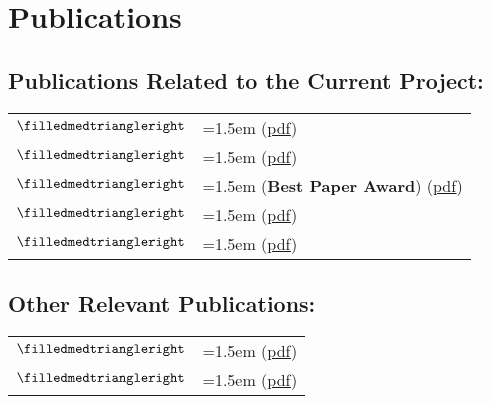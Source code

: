 \documentclass[12pt,letterpaper,oneside]{article}
\newcommand{\gbulletlight}{\footnotesize{\color{bulletgray2}$\filledmedtriangleright$}}
\newcommand{\pindent}{\hangindent=1.5em\hangafter=1}
\begin{document}
    
    \begingroup
        \makeatletter
        \let\@bibitem\saved@bibitem
    \endgroup

    \section{Publications}
    \label{sec:pubs}
        \vspace{-1.0em}
        \subsection{Publications Related to the Current Project:}
        \label{subsec:relatedpubs}
            \vspace{-1.5em}
            \begin{longtable}{XY}
                \gbulletlight{} & \pindent{} (\href{http://bconnelly.net/wp-content/papercite-data/pdf/beckmann2012evolution.pdf}{pdf})\\
                \gbulletlight{} & \pindent{} (\href{http://bconnelly.net/wp-content/papercite-data/pdf/connelly2011modeling.pdf}{pdf})\\
                \gbulletlight{} & \pindent{} ({\bfseries Best Paper Award}) (\href{http://bconnelly.net/wp-content/papercite-data/pdf/connelly2010resource.pdf}{pdf})\\
                \gbulletlight{} & \pindent{} (\href{http://bconnelly.net/wp-content/papercite-data/pdf/connelly2010social.pdf}{pdf})\\
                \gbulletlight{} & \pindent{} (\href{http://bconnelly.net/wp-content/papercite-data/pdf/connelly2009evolving.pdf}{pdf})\\
            \end{longtable}

        \vspace{-0.6em}
        \subsection{Other Relevant Publications:}
        \label{subsec:otherpubs}
            \vspace{-1.5em}
            \begin{longtable}{XY}
                \gbulletlight{} & \pindent{} (\href{http://bconnelly.net/wp-content/papercite-data/pdf/connelly2012seeds.pdf}{pdf})\\
                \gbulletlight{} & \pindent{} (\href{http://bconnelly.net/wp-content/papercite-data/pdf/connelly2009aevolving.pdf}{pdf})\\
            \end{longtable}
\end{document}
